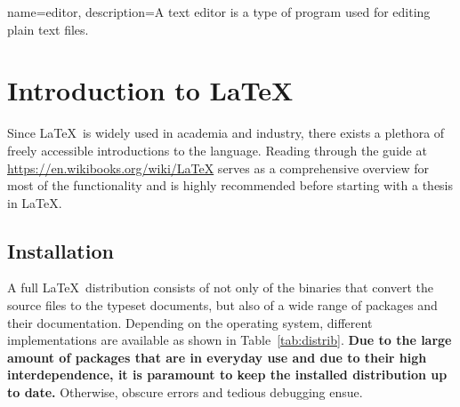 %
%
%
%



{
  name={editor},
  description={A text editor is a type of program used for editing plain text files.}
}

\chapter{Introduction to \LaTeX}

Since \LaTeX\ is widely used in academia and industry, there exists a plethora of freely accessible introductions to the language.
Reading through the guide at \url{https://en.wikibooks.org/wiki/LaTeX} serves as a comprehensive overview for most of the functionality and is highly recommended before starting with a thesis in \LaTeX.

\section{Installation}

A full \LaTeX\ distribution consists of not only of the binaries that convert the source files to the typeset documents, but also of a wide range of packages and their documentation.
Depending on the operating system, different implementations are available as shown in Table~\ref{tab:distrib}.
\textbf{Due to the large amount of packages that are in everyday use and due to their high interdependence, it is paramount to keep the installed distribution up to date.}
Otherwise, obscure errors and tedious debugging ensue.

